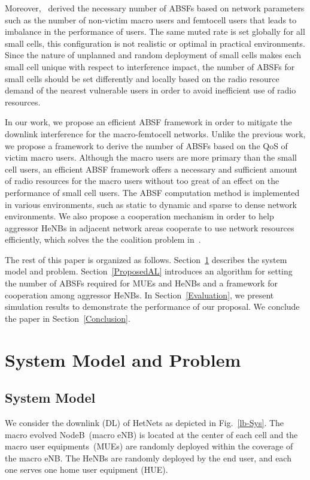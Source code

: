 \documentclass[paper]{ieice}
\begin{document}
Moreover,~\cite{Lembo2013,Cierny13} derived the necessary number of ABSFs based on network parameters such as the number of non-victim macro users and femtocell users that leads to imbalance in the performance of users. The same muted rate is set globally for all small cells, this configuration is not realistic or optimal in practical environments. Since the nature of unplanned and random deployment of small cells makes each small cell unique with respect to interference impact, the number of ABSFs for small cells should be set differently and locally based on the radio resource demand of the nearest vulnerable users in order to avoid inefficient use of radio resources.

In our work, we propose an efficient ABSF framework in order to mitigate the downlink interference for the macro-femtocell networks. Unlike the previous work, we propose a framework to derive the number of ABSFs based on the QoS of victim macro users. Although the macro users are more primary than the small cell users, an efficient ABSF framework offers a necessary and sufficient amount of radio resources for the macro users without too great of an effect on the performance of small cell users. The ABSF computation method is implemented in various environments, such as static to dynamic and sparse to dense network environments. We also propose a cooperation mechanism in order to help aggressor HeNBs in adjacent network areas cooperate to use network resources efficiently, which solves the the coalition problem in~\cite{Kamel2013}.

The rest of this paper is organized as follows. Section~\ref{lb-SM-P} describes the system model and problem. Section~\ref{ProposedAL} introduces an algorithm for setting the number of ABSFs required for MUEs and HeNBs and a framework for cooperation among aggressor HeNBs. In Section~\ref{Evaluation}, we present simulation results to demonstrate the performance of our proposal. We conclude the paper in Section~\ref{Conclusion}.

\section{System Model and Problem}
\label{lb-SM-P}
\subsection{System Model}
\label{lb-SystemModel}
We consider the downlink (DL) of HetNets as depicted in Fig.~\ref{lb-Sys}. The macro evolved NodeB~(macro eNB) is located at the center of each cell and the macro user equipments~(MUEs) are randomly deployed within the coverage of the macro eNB. The HeNBs are randomly deployed by the end user, and each one serves one home user equipment (HUE).
\end{document}
